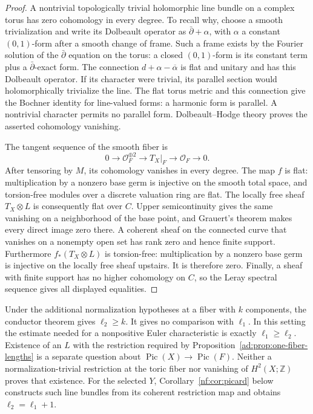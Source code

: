 \documentclass[11pt]{article}
\numberwithin{equation}{section}
\begin{document}
\begin{proof}
A nontrivial topologically trivial holomorphic line bundle on a
complex torus has zero cohomology in every degree. To recall why,
choose a smooth trivialization and write its Dolbeault operator as
$\bar\partial+\alpha$, with $\alpha$ a constant $(0,1)$-form after
a smooth change of frame. Such a frame exists by the Fourier
solution of the $\bar\partial$ equation on the torus: a closed
$(0,1)$-form is its constant term plus a $\bar\partial$-exact form.
The connection $d+\alpha-\overline\alpha$ is flat and unitary and
has this Dolbeault operator. If its character were trivial, its
parallel section would holomorphically trivialize the line.
The flat torus metric and this connection give the Bochner
identity for line-valued forms: a harmonic form is parallel.
A nontrivial character permits no parallel form. Dolbeault--Hodge
theory proves the asserted cohomology vanishing.

The tangent sequence of the smooth fiber is
\[
 0\longrightarrow\mathcal O_F^{\oplus2}
 \longrightarrow T_X|_F\longrightarrow\mathcal O_F\longrightarrow0.
\]
After tensoring by $M$, its cohomology vanishes in every degree.
The map $f$ is flat: multiplication by a nonzero base germ is
injective on the smooth total space, and torsion-free modules over
a discrete valuation ring are flat. The locally free sheaf
$T_X\otimes L$ is consequently flat over $C$.
Upper semicontinuity gives the same vanishing on a neighborhood of
the base point, and Grauert's theorem makes every direct image
zero there. A coherent sheaf on the connected curve that vanishes
on a nonempty open set has rank zero and hence finite support.
Furthermore $f_*(T_X\otimes L)$ is torsion-free: multiplication by
a nonzero base germ is injective on the locally free sheaf upstairs.
It is therefore zero. Finally, a sheaf with finite support has no
higher cohomology on $C$, so the Leray spectral sequence gives
all displayed equalities.
\end{proof}

Under the additional normalization hypotheses at a fiber with
$k$ components, the conductor theorem gives $\ell_2\ge k$.
It gives no comparison with $\ell_1$. In this setting the estimate
needed for a nonpositive Euler characteristic is exactly
$\ell_1\ge\ell_2$.
Existence of an $L$ with the restriction required by
Proposition~\ref{ad:prop:one-fiber-lengths} is a separate question
about $\operatorname{Pic}(X)\to\operatorname{Pic}(F)$.
Neither a normalization-trivial restriction at the toric fiber nor
vanishing of $H^2(X;\mathbb Z)$ proves that existence.
For the selected $Y$, Corollary~\ref{nf:cor:picard} below
constructs such line bundles from its coherent restriction map
and obtains $\ell_2=\ell_1+1$.
\end{document}
